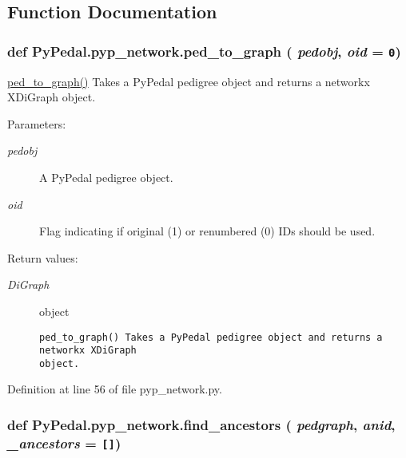 \subsection{Function Documentation}
\hypertarget{namespacePyPedal_1_1pyp__network_800efc2cc1a885abd2d4af54f9dc38d5}{
\subsubsection[ped\_\-to\_\-graph]{\setlength{\rightskip}{0pt plus 5cm}def Py\-Pedal.pyp\_\-network.ped\_\-to\_\-graph ( {\em pedobj},  {\em oid} = {\tt 0})}}
\label{namespacePyPedal_1_1pyp__network_800efc2cc1a885abd2d4af54f9dc38d5}


\hyperlink{namespacePyPedal_1_1pyp__network_800efc2cc1a885abd2d4af54f9dc38d5}{ped\_\-to\_\-graph()} Takes a Py\-Pedal pedigree object and returns a networkx XDi\-Graph object. 

\begin{Desc}
\item[Parameters:]
\begin{description}
\item[{\em pedobj}]A Py\-Pedal pedigree object. \item[{\em oid}]Flag indicating if original (1) or renumbered (0) IDs should be used. \end{description}
\end{Desc}
\begin{Desc}
\item[Return values:]
\begin{description}
\item[{\em Di\-Graph}]object

\footnotesize\begin{verbatim}ped_to_graph() Takes a PyPedal pedigree object and returns a networkx XDiGraph
object.
\end{verbatim}
\normalsize
 \end{description}
\end{Desc}


Definition at line 56 of file pyp\_\-network.py.\hypertarget{namespacePyPedal_1_1pyp__network_3e638a2ecefb9a7a010490534e8c5cd3}{
\subsubsection[find\_\-ancestors]{\setlength{\rightskip}{0pt plus 5cm}def Py\-Pedal.pyp\_\-network.find\_\-ancestors ( {\em pedgraph},  {\em anid},  {\em \_\-ancestors} = {\tt \mbox{[}\mbox{]}})}}
\label{namespacePyPedal_1_1pyp__network_3e638a2ecefb9a7a010490534e8c5cd3}


